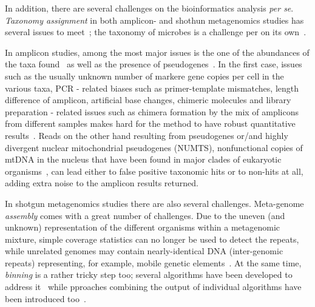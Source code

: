       In addition, there are several challenges on the bioinformatics analysis \textit{per se}.
      \textit{Taxonomy assignment} in both amplicon- and shothun metagenomics studies 
      has several issues to meet~\cite{simon2019benchmarking};
      the taxonomy of microbes is a challenge per on its own~\cite{parks2020complete}.

      In amplicon studies, among the most major issues is the one of the abundances of the
      taxa found~\cite{fonseca2018pitfalls, balint2016millions} as well as the presence of pseudogenes~\cite{song2008many}.
      In the first case, 
      issues such as  
      the usually unknown number of markere gene copies per cell in the various taxa,
      PCR - related biases such as primer-template mismatches, length difference of amplicon, artificial base changes, chimeric molecules 
      and library preparation - related issues such as chimera formation by the mix of amplicons from different samples
      makes hard for the method to have robust quantitative results~\cite{balint2016millions}. 
      Reads on the other hand resulting from pseudogenes or/and highly divergent nuclear mitochondrial pseudogenes (NUMTS), nonfunctional copies of mtDNA in the nucleus that have been found in major clades of eukaryotic organisms~\cite{bensasson2001mitochondrial}, 
      can lead either to false positive taxonomic hits or to non-hits at all,
      adding extra noise to the amplicon results returned.

      In shotgun metagenomics studies there are also several challenges. 
      Meta-genome \textit{assembly} comes with a great number of challenges. 
      Due to the uneven (and unknown) representation of the different organisms within a metagenomic mixture, simple coverage statistics can no longer be used to detect the repeats, while unrelated genomes may contain
      nearly-identical DNA (inter-genomic repeats) representing, for example, mobile genetic elements~\cite{ghurye2016focus}.
      At the same time, \textit{binning} is a rather tricky step too; 
      several algorithms have been developed to address it~\cite{yue2020evaluating}
      while pproaches combining the output of individual algorithms have been introduced too~\cite{song2017binning_refiner}.


